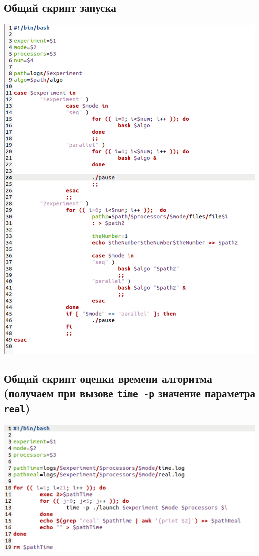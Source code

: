 \documentclass[10pt, a4paper]{article}
\begin{document}
\subsection*{Общий скрипт запуска} 
\includegraphics[scale=0.7]{scripts/launch.png}
\subsection*{Общий скрипт оценки времени алгоритма (получаем при вызове \texttt{time -p} значение параметра \texttt{real})}
\includegraphics[scale=0.7]{scripts/pause.png}
\end{document}
